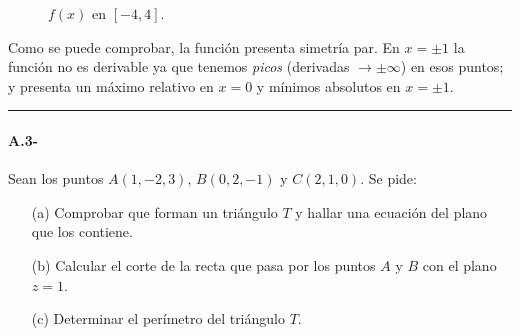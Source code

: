 \begin{enumerate}
\begin{figure}[!h]
        \caption*{$f(x)$ en $[-4,4]$.}
        \label{fig:enter-label}
    \end{figure}
    Como se puede comprobar, la función presenta simetría par. En $x=\pm 1$ la función no es derivable ya que tenemos \emph{picos} (derivadas $\to \pm \infty$) en esos puntos; y presenta un máximo relativo en $x=0$ y mínimos absolutos en $x=\pm 1$.
\end{enumerate}
    
\noindent\rule{\textwidth}{0.5pt}
\begin{mybox}
    \paragraph{A.3-} Sean los puntos $A(1,-2,3)$, $B(0,2,-1)$ y $C(2,1,0)$. Se pide:
    \begin{enumerate}
        \item[(a)] Comprobar que forman un triángulo $T$ y hallar una ecuación del plano que los contiene.
        \item[(b)] Calcular el corte de la recta que pasa por los puntos $A$ y $B$ con el plano $z = 1$.
        \item[(c)] Determinar el perímetro del triángulo $T$. 
    \end{enumerate}
\end{mybox}
